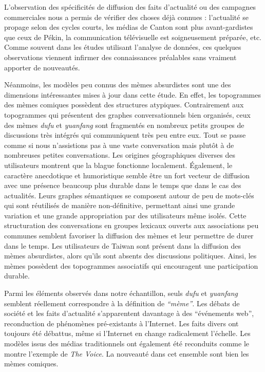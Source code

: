 L'observation des spécificités de diffusion des faits d'actualité ou des campagnes commerciales nous a permis de vérifier des choses déjà connues : l'actualité se propage selon des cycles courts, les médias de Canton sont plus avant-gardistes que ceux de Pékin, la communication télévisuelle est soigneusement préparée, etc. Comme souvent dans les études utilisant l'analyse de données, ces quelques observations viennent infirmer des connaissances préalables sans vraiment apporter de nouveautés. 

Néanmoins, les modèles peu connus des mèmes absurdistes sont une des dimensions intéressantes mises à jour dans cette étude. En effet, les topogrammes des mèmes comiques possèdent des structures atypiques. Contrairement aux topogrammes qui présentent des graphes conversationnels bien organisés, ceux des mèmes \textit{dufu} et \textit{yuanfang} sont fragmentés en nombreux petits groupes de discussions très intégrés qui communiquent très peu entre eux. Tout se passe comme si nous n'assistions pas à une vaste conversation mais plutôt à de nombreuses petites conversations. Les origines géographiques diverses des utilisateurs montrent que la blague fonctionne localement. Également, le caractère anecdotique et humoristique semble être un fort vecteur de diffusion avec une présence beaucoup plus durable dans le temps que dans le cas des actualités. Leurs graphes sémantiques se composent autour de peu de mots-clés qui sont réutilisés de manière non-définitive, permettant ainsi une grande variation et une grande appropriation par des utilisateurs même isolés. Cette structuration des conversations en groupes lexicaux ouverts aux associations peu communes semblent favoriser la diffusion des mèmes et leur permettre de durer dans le temps. Les utilisateurs de Taiwan sont présent dans la diffusion des mèmes absurdistes, alors qu'ils sont absents des discussions politiques. Ainsi, les mèmes possèdent des topogrammes associatifs qui encouragent une participation durable.

Parmi les éléments observés dans notre échantillon, seuls \textit{dufu} et \textit{yuanfang} semblent réellement correspondre à la définition de \textit{``mème''}. Les débats de société et les faits d'actualité s'apparentent davantage à des ``événements web'', reconduction de phénomènes pré-existants à l'Internet. Les faits divers ont toujours été débattus, même si l'Internet en change radicalement l'échelle. Les modèles issus des médias traditionnels ont également été reconduits comme le montre l'exemple de \textit{The Voice}. La nouveauté dans cet ensemble sont bien les mèmes comiques. 

